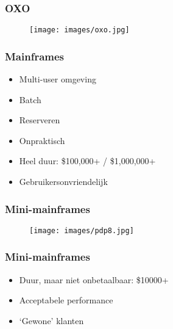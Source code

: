 \documentclass[aspectratio=43]{uva-inf-presentation}
\begin{document}

\begin{frame}
\frametitle{OXO}

\begin{figure}
\texttt{[image: images/oxo.jpg]}
\end{figure}

\end{frame}




\begin{frame}
\frametitle{Mainframes}

\begin{itemize}
\item Multi-user omgeving
\item Batch
\item Reserveren
\item Onpraktisch
\item Heel duur: \$100,000+ / \$1,000,000+
\item Gebruikersonvriendelijk
\end{itemize}

\end{frame}


\begin{frame}
\frametitle{Mini-mainframes}

\begin{figure}
\texttt{[image: images/pdp8.jpg]}
\end{figure}

\end{frame}


\begin{frame}
\frametitle{Mini-mainframes}

\begin{itemize}
\item Duur, maar niet onbetaalbaar: \$10000+
\item Acceptabele performance
\item `Gewone' klanten
\end{itemize}

\end{frame}
\end{document}
